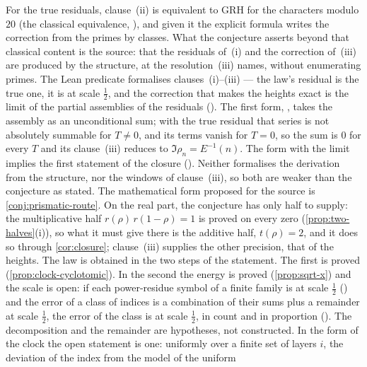 \begin{remark}\label{rmk:closure-status}
For the true residuals, clause~(ii) is equivalent to GRH for the characters modulo $20$
(the classical equivalence, ), and given it the
explicit formula writes the correction from the primes by classes.  What the conjecture asserts
beyond that classical content is the source: that the residuals of~(i) and the correction of~(iii)
are produced by the structure, at the resolution~(iii) names, without enumerating primes.  The Lean
predicate
formalises clauses~(i)--(iii) --- the law's residual
is the true one, it is at scale $\tfrac12$, and the
correction that makes the heights exact is the limit
of the partial assemblies of the residuals
().  The
first form, ,
takes the assembly as an unconditional sum; with the
true residual that series is not absolutely
summable for $T\ne0$, and its terms vanish for
$T=0$, so the sum is $0$ for every $T$ and its
clause~(iii) reduces to $\Im\rho_n=E^{-1}(n)$.  The form with the
limit implies the first statement of the closure
().  Neither formalises the derivation from
the structure, nor the windows of
clause~(iii), so both are weaker than the conjecture
as stated.
  The
mathematical form proposed for the source is \cref{conj:prismatic-route}.  On the real part, the
conjecture has only half to supply: the multiplicative half $r(\rho)\,r(1-\rho)=1$ is proved on every
zero (\cref{prop:two-halves}(i)), so what it must give there is the additive half, $t(\rho)=2$, and
it does so through \cref{cor:closure}; clause~(iii) supplies the other precision, that of the
heights.  The law is obtained in the two steps of the
statement.  The first is proved
(\cref{prop:clock-cyclotomic}).  In the second the
energy is proved (\cref{prop:sqrt-x}) and the scale is
open: if each power-residue symbol of a finite family is
at scale $\tfrac12$ ()
and the error of a class of indices is a combination of
their sums plus a remainder at scale $\tfrac12$, the
error of the class is at scale $\tfrac12$, in count and
in proportion
().  The decomposition and the remainder are
hypotheses, not constructed.  In the form of the clock
the open statement is one: uniformly over a finite set of
layers $i$, the deviation of the index from the model of the uniform

\end{remark}
